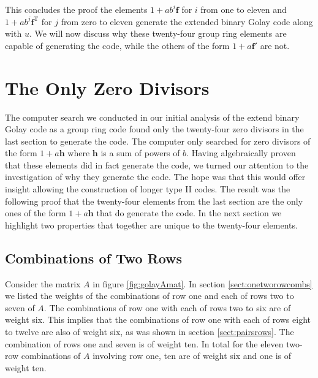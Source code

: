 This concludes the proof the elements $1+a b^i \mathbf{f}$ for $i$ from one to eleven and $1+a b^j \mathbf{f}^{\textrm{T}}$ for $j$ from zero to eleven generate the extended binary Golay code along with $u$.
We will now discuss why these twenty-four group ring elements are capable of generating the code, while the others of the form $1+a \mathbf{f}'$ are not.

\section{The Only Zero Divisors}
\label{sect:setdifferences}
The computer search we conducted in our initial analysis of the extend binary Golay code as a group ring code found only the twenty-four zero divisors in the last section to generate the code.
The computer only searched for zero divisors of the form $1+a \mathbf{h}$ where $\mathbf{h}$ is a sum of powers of $b$.
Having algebraically proven that these elements did in fact generate the code, we turned our attention to the investigation of why they generate the code.
The hope was that this would offer insight allowing the construction of longer type II codes.
The result was the following proof that the twenty-four elements from the last section are the only ones of the form $1+a \mathbf{h}$ that do generate the code.
In the next section we highlight two properties that together are unique to the twenty-four elements.

\subsection{Combinations of Two Rows}
Consider the matrix $A$ in figure \ref{fig:golayAmat}.
In section \ref{sect:onetworowcombs} we listed the weights of the combinations of row one and each of rows two to seven of $A$.
The combinations of row one with each of rows two to six are of weight six.
This implies that the combinations of row one with each of rows eight to twelve are also of weight six, as was shown in section \ref{sect:pairsrows}.
The combination of rows one and seven is of weight ten.
In total for the eleven two-row combinations of $A$ involving row one, ten are of weight six and one is of weight ten.


